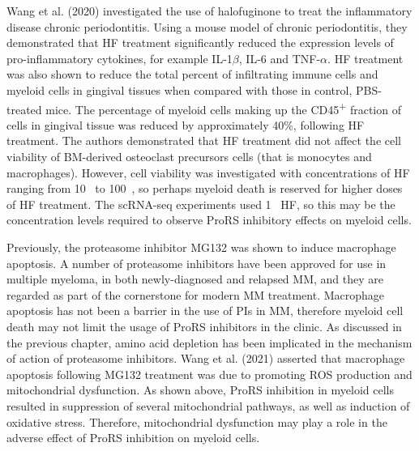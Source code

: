 Wang et al. (2020) investigated the use of halofuginone to treat the inflammatory disease chronic periodontitis\cite{wang2020halofuginone}.
Using a mouse model of chronic periodontitis, they demonstrated that HF treatment significantly reduced the expression levels of pro-inflammatory cytokines, for example IL-1$\beta$, IL-6 and TNF-$\alpha$.
HF treatment was also shown to reduce the total percent of infiltrating immune cells and myeloid cells in gingival tissues when compared with those in control, PBS-treated mice.
The percentage of myeloid cells making up the CD45\textsuperscript{+} fraction of cells in gingival tissue was reduced by approximately 40\%, following HF treatment.
The authors demonstrated that HF treatment did not affect the cell viability of BM-derived osteoclast precursors cells (that is monocytes and macrophages).
However, cell viability was investigated with concentrations of HF ranging from 10\si{\pico\Molar} to 100\si{\nano\Molar}, so perhaps myeloid death is reserved for higher doses of HF treatment.
The scRNA-seq experiments used 1\si{\micro\Molar} HF, so this may be the concentration levels required to observe ProRS inhibitory effects on myeloid cells.

Previously, the proteasome inhibitor MG132 was shown to induce macrophage apoptosis\cite{wang2021proteasome}.
A number of proteasome inhibitors have been approved for use in multiple myeloma, in both newly-diagnosed and relapsed MM, and they are regarded as part of the cornerstone for modern MM treatment.
Macrophage apoptosis has not been a barrier in the use of PIs in MM, therefore myeloid cell death may not limit the usage of ProRS inhibitors in the clinic.
As discussed in the previous chapter, amino acid depletion has been implicated in the mechanism of action of proteasome inhibitors.
Wang et al. (2021) asserted that macrophage apoptosis following MG132 treatment was due to promoting ROS production and mitochondrial dysfunction\cite{wang2021proteasome}.
As shown above, ProRS inhibition in myeloid cells resulted in suppression of several mitochondrial pathways, as well as induction of oxidative stress.
Therefore, mitochondrial dysfunction may play a role in the adverse effect of ProRS inhibition on myeloid cells.

